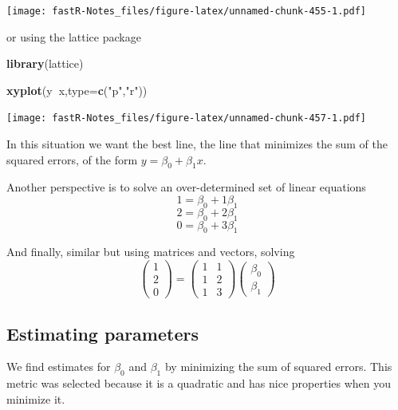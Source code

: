 \documentclass[]{book}
\newenvironment{Shaded}{\begin{snugshade}}{\end{snugshade}}
\newcommand{\KeywordTok}[1]{\textcolor[rgb]{0.13,0.29,0.53}{\textbf{#1}}}
\newcommand{\DataTypeTok}[1]{\textcolor[rgb]{0.13,0.29,0.53}{#1}}
\newcommand{\StringTok}[1]{\textcolor[rgb]{0.31,0.60,0.02}{#1}}
\newcommand{\OperatorTok}[1]{\textcolor[rgb]{0.81,0.36,0.00}{\textbf{#1}}}
\newcommand{\NormalTok}[1]{#1}
\theoremstyle{definition}
\theoremstyle{definition}
\theoremstyle{definition}
\theoremstyle{remark}
\begin{document}
\texttt{[image: fastR-Notes\_files/figure-latex/unnamed-chunk-455-1.pdf]}

or using the lattice package

\begin{Shaded}
\begin{Highlighting}[]
\KeywordTok{library}\NormalTok{(lattice)}
\end{Highlighting}
\end{Shaded}

\begin{Shaded}
\begin{Highlighting}[]
\KeywordTok{xyplot}\NormalTok{(y}\OperatorTok{~}\NormalTok{x,}\DataTypeTok{type=}\KeywordTok{c}\NormalTok{(}\StringTok{"p"}\NormalTok{,}\StringTok{"r"}\NormalTok{))}
\end{Highlighting}
\end{Shaded}

\texttt{[image: fastR-Notes\_files/figure-latex/unnamed-chunk-457-1.pdf]}

In this situation we want the best line, the line that minimizes the sum
of the squared errors, of the form \(y=\beta_{0}+\beta_{1}x\).

Another perspective is to solve an over-determined set of linear
equations \[1=\beta_{0}+1\beta_{1}\] \[2=\beta_{0}+2\beta_{1}\]
\[0=\beta_{0}+3\beta_{1}\]

And finally, similar but using matrices and vectors, solving
\[\left( \begin{array}{c} 1 \\ 2 \\ 0 \end{array} \right) = \left( \begin{array}{cc} 1 & 1 \\ 1 & 2 \\ 1 & 3 \end{array} \right)\left( \begin{array}{c} \beta_{0} \\ \beta_{1} \end{array} \right)\]

\subsection{Estimating parameters}\label{estimating-parameters}

We find estimates for \(\beta_{0}\) and \(\beta_{1}\) by minimizing the
sum of squared errors. This metric was selected because it is a
quadratic and has nice properties when you minimize it.
\end{document}
